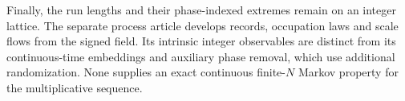 Finally, the run lengths and their phase-indexed extremes remain on an
integer lattice. The separate process article
\cite{PoulyLatticePoissonFlows2026} develops records, occupation laws and
scale flows from the signed field. Its intrinsic integer observables are
distinct from its continuous-time embeddings and auxiliary phase removal,
which use additional randomization. None supplies an exact continuous
finite-$N$ Markov property for the multiplicative sequence.
